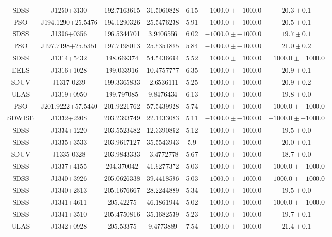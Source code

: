 \begin{table}
\begin{tabular}{ccccccc}
SDSS & J1250+3130 & 192.7163615 & 31.5060828 & 6.15 & $-1000.0\pm-1000.0$ & $  20.3\pm  0.1$ \\
PSO & J194.1290+25.5476 & 194.1290326 & 25.5476238 & 5.91 & $-1000.0\pm-1000.0$ & $  20.5\pm  0.1$ \\
SDSS & J1306+0356 & 196.5344701 & 3.9406556 & 6.02 & $-1000.0\pm-1000.0$ & $  19.7\pm  0.1$ \\
PSO & J197.7198+25.5351 & 197.7198013 & 25.5351885 & 5.84 & $-1000.0\pm-1000.0$ & $  21.0\pm  0.2$ \\
SDSS & J1314+5432 & 198.668374 & 54.5436694 & 5.52 & $-1000.0\pm-1000.0$ & $-1000.0\pm-1000.0$ \\
DELS & J1316+1028 & 199.033916 & 10.4757777 & 6.35 & $-1000.0\pm-1000.0$ & $  20.9\pm  0.1$ \\
SDUV & J1317-0239 & 199.3365833 & -2.6536111 & 5.25 & $-1000.0\pm-1000.0$ & $  20.9\pm  0.2$ \\
ULAS & J1319+0950 & 199.797085 & 9.8476434 & 6.13 & $-1000.0\pm-1000.0$ & $  19.8\pm  0.0$ \\
PSO & J201.9222+57.5440 & 201.9221762 & 57.5439928 & 5.74 & $-1000.0\pm-1000.0$ & $-1000.0\pm-1000.0$ \\
SDWISE & J1332+2208 & 203.2393749 & 22.1433083 & 5.11 & $-1000.0\pm-1000.0$ & $-1000.0\pm-1000.0$ \\
SDSS & J1334+1220 & 203.5523482 & 12.3390862 & 5.12 & $-1000.0\pm-1000.0$ & $  19.5\pm  0.0$ \\
SDSS & J1335+3533 & 203.9617127 & 35.5543943 & 5.9 & $-1000.0\pm-1000.0$ & $  20.0\pm  0.1$ \\
SDUV & J1335-0328 & 203.9843333 & -3.4772778 & 5.67 & $-1000.0\pm-1000.0$ & $  18.7\pm  0.0$ \\
SDSS & J1337+4155 & 204.370042 & 41.9277372 & 5.03 & $-1000.0\pm-1000.0$ & $-1000.0\pm-1000.0$ \\
SDSS & J1340+3926 & 205.0626338 & 39.4418596 & 5.03 & $-1000.0\pm-1000.0$ & $-1000.0\pm-1000.0$ \\
SDSS & J1340+2813 & 205.1676667 & 28.2244889 & 5.34 & $-1000.0\pm-1000.0$ & $  19.5\pm  0.0$ \\
SDSS & J1341+4611 & 205.42275 & 46.1861944 & 5.02 & $-1000.0\pm-1000.0$ & $-1000.0\pm-1000.0$ \\
SDSS & J1341+3510 & 205.4750816 & 35.1682539 & 5.23 & $-1000.0\pm-1000.0$ & $  19.7\pm  0.1$ \\
ULAS & J1342+0928 & 205.53375 & 9.4773889 & 7.54 & $-1000.0\pm-1000.0$ & $  21.4\pm  0.1$ \\

\end{tabular}
\end{table}
